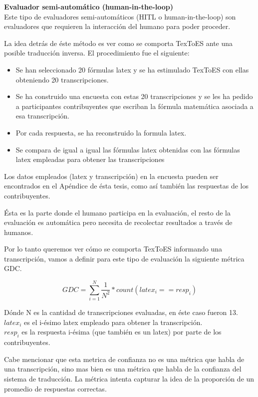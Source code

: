 {\Large \textbf{Evaluador semi-automático (human-in-the-loop)}}\\

Este tipo de evaluadores semi-automáticos (HITL o human-in-the-loop) son evaluadores que requieren la interacción del humano para poder proceder.

La idea detrás de éste método es ver como se comporta TexToES ante una posible traducción inversa. El procedimiento fue el siguiente:

\begin{itemize}
    \item Se han seleccionado 20 fórmulas latex y se ha estimulado TexToES con ellas obteniendo 20 transcripciones.
    \item Se ha construido una encuesta con estas 20 transcripciones y se les ha pedido a participantes contribuyentes que escriban la fórmula matemática asociada a esa transcripción.
    \item Por cada respuesta, se ha reconstruido la formula latex.
    \item Se compara de igual a igual las fórmulas latex obtenidas con las fórmulas latex empleadas para obtener las transcripciones
\end{itemize}

Los datos empleados (latex y transcripción) en la encuesta pueden ser encontrados en el Apéndice de ésta tesis, como así también las respuestas de los contribuyentes.

Ésta es la parte donde el humano participa en la evaluación, el resto de la evaluación es automática pero necesita de recolectar resultados a través de humanos.

Por lo tanto queremos ver cómo se comporta TexToES informando una transcripción, vamos a definir para este tipo de evaluación la siguiente métrica GDC.

$$GDC = \sum_{i=1}^{N} \frac{1}{N^2}*count(latex_i==resp_i)$$

Dónde N es la cantidad de transcripciones evaluadas, en éste caso fueron 13.\\
$latex_i$ es el i-ésimo latex empleado para obtener la transcripción.\\
$resp_i$ es la respuesta i-ésima (que también es un latex) por parte de los contribuyentes.

Cabe mencionar que esta metrica de confianza no es una métrica que habla de una transcripción, sino mas bien es una métrica que habla de la confianza del sistema de traducción. La métrica intenta capturar la idea de la proporción de un promedio de respuestas correctas.\\

